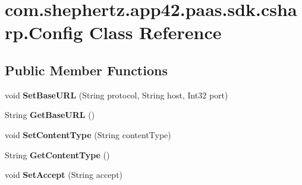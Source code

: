 \hypertarget{classcom_1_1shephertz_1_1app42_1_1paas_1_1sdk_1_1csharp_1_1_config}{\section{com.\+shephertz.\+app42.\+paas.\+sdk.\+csharp.\+Config Class Reference}
\label{classcom_1_1shephertz_1_1app42_1_1paas_1_1sdk_1_1csharp_1_1_config}
}
\subsection*{Public Member Functions}
\begin{DoxyCompactItemize}
\item 
\hypertarget{classcom_1_1shephertz_1_1app42_1_1paas_1_1sdk_1_1csharp_1_1_config_a46f850e33a02ef0a45cd7b30bbdc19bf}{void {\bfseries Set\+Base\+U\+R\+L} (String protocol, String host, Int32 port)}\label{classcom_1_1shephertz_1_1app42_1_1paas_1_1sdk_1_1csharp_1_1_config_a46f850e33a02ef0a45cd7b30bbdc19bf}

\item 
\hypertarget{classcom_1_1shephertz_1_1app42_1_1paas_1_1sdk_1_1csharp_1_1_config_a645921d5c3d7c81f01e703cba5d60aeb}{String {\bfseries Get\+Base\+U\+R\+L} ()}\label{classcom_1_1shephertz_1_1app42_1_1paas_1_1sdk_1_1csharp_1_1_config_a645921d5c3d7c81f01e703cba5d60aeb}

\item 
\hypertarget{classcom_1_1shephertz_1_1app42_1_1paas_1_1sdk_1_1csharp_1_1_config_a60eaeefc20b048dad592a0b1540abce0}{void {\bfseries Set\+Content\+Type} (String content\+Type)}\label{classcom_1_1shephertz_1_1app42_1_1paas_1_1sdk_1_1csharp_1_1_config_a60eaeefc20b048dad592a0b1540abce0}

\item 
\hypertarget{classcom_1_1shephertz_1_1app42_1_1paas_1_1sdk_1_1csharp_1_1_config_a4ce072fb37bbdef50cb17256e684b675}{String {\bfseries Get\+Content\+Type} ()}\label{classcom_1_1shephertz_1_1app42_1_1paas_1_1sdk_1_1csharp_1_1_config_a4ce072fb37bbdef50cb17256e684b675}

\item 
\hypertarget{classcom_1_1shephertz_1_1app42_1_1paas_1_1sdk_1_1csharp_1_1_config_a4f5ca128be8a053bfdbda159157410ad}{void {\bfseries Set\+Accept} (String accept)}\label{classcom_1_1shephertz_1_1app42_1_1paas_1_1sdk_1_1csharp_1_1_config_a4f5ca128be8a053bfdbda159157410ad}


\end{DoxyCompactItemize}
